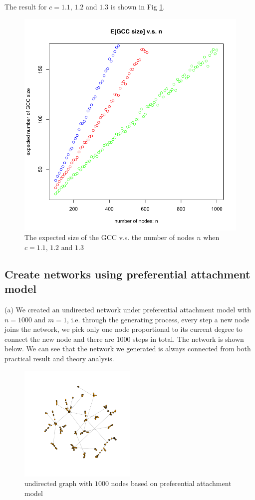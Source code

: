 \documentclass[draftcls,12pt,onecolumn]{IEEEtran}
\begin{document}
The result for $c=1.1$, $1.2$ and $1.3$ is shown in Fig \ref{fig14}.
\begin{figure}[H]
\centering
\includegraphics[scale=0.3]{figures_part1_1/output_24_0.png}
\caption{The expected size of the GCC v.s. the number of nodes $n$ when $c=1.1$, $1.2$ and $1.3$}
\label{fig14}
\end{figure}







\subsection{Create networks using preferential attachment model}
(a) We created an undirected network under preferential attachment model with $n = 1000$ and $m = 1$, i.e. through the generating process, every step a new node joins the network, we pick only one node proportional to its current degree to connect the new node and there are 1000 steps in total. The network is shown below. We can see that the network we generated is always connected from both practical result and theory analysis.
\begin{figure}[H]
\centering
\includegraphics[width=0.5\textwidth]{1_2_a_network.png}
\caption{undirected graph with $1000$ nodes based on preferential attachment model}
\end{figure}
\end{document}
